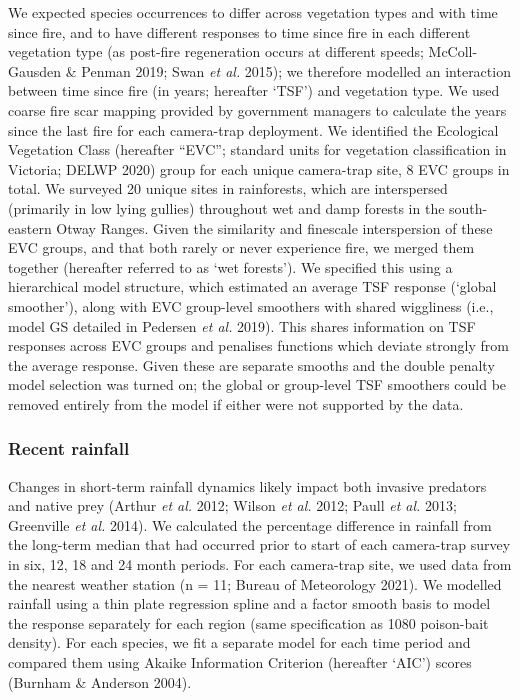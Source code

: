 \documentclass[11pt,a4paper,titlepage,twoside,openright]{style/unimelbthesis}
\begin{document}
\begin{mainmatter}
We expected species occurrences to differ across vegetation types and with time since fire, and to have different responses to time since fire in each different vegetation type (as post-fire regeneration occurs at different speeds; McColl-Gausden \& Penman 2019; Swan \emph{et al.} 2015); we therefore modelled an interaction between time since fire (in years; hereafter `TSF') and vegetation type. We used coarse fire scar mapping provided by government managers to calculate the years since the last fire for each camera-trap deployment. We identified the Ecological Vegetation Class (hereafter ``EVC''; standard units for vegetation classification in Victoria; DELWP 2020) group for each unique camera-trap site, 8 EVC groups in total. We surveyed 20 unique sites in rainforests, which are interspersed (primarily in low lying gullies) throughout wet and damp forests in the south-eastern Otway Ranges. Given the similarity and finescale interspersion of these EVC groups, and that both rarely or never experience fire, we merged them together (hereafter referred to as `wet forests'). We specified this using a hierarchical model structure, which estimated an average TSF response (`global smoother'), along with EVC group-level smoothers with shared wiggliness (i.e., model GS detailed in Pedersen \emph{et al.} 2019). This shares information on TSF responses across EVC groups and penalises functions which deviate strongly from the average response. Given these are separate smooths and the double penalty model selection was turned on; the global or group-level TSF smoothers could be removed entirely from the model if either were not supported by the data.

\hypertarget{recent-rainfall}{%
\subsubsection{Recent rainfall}\label{recent-rainfall}}

Changes in short-term rainfall dynamics likely impact both invasive predators and native prey (Arthur \emph{et al.} 2012; Wilson \emph{et al.} 2012; Paull \emph{et al.} 2013; Greenville \emph{et al.} 2014). We calculated the percentage difference in rainfall from the long-term median that had occurred prior to start of each camera-trap survey in six, 12, 18 and 24 month periods. For each camera-trap site, we used data from the nearest weather station (n = 11; Bureau of Meteorology 2021). We modelled rainfall using a thin plate regression spline and a factor smooth basis to model the response separately for each region (same specification as 1080 poison-bait density). For each species, we fit a separate model for each time period and compared them using Akaike Information Criterion (hereafter `AIC') scores (Burnham \& Anderson 2004).


\end{mainmatter}
\end{document}

